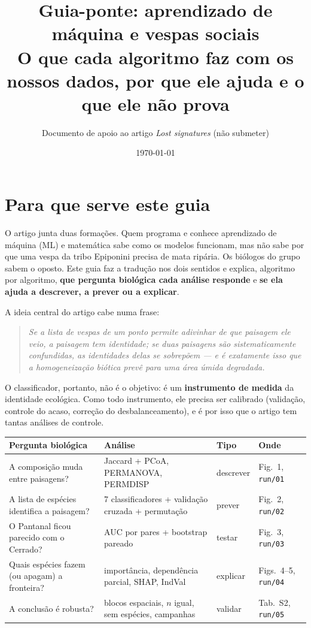 \documentclass[11pt,a4paper]{article}
\title{Guia-ponte: aprendizado de máquina e vespas sociais\\[2pt]
\large O que cada algoritmo faz com os nossos dados, por que ele ajuda e o que ele não prova}
\author{Documento de apoio ao artigo \emph{Lost signatures} (não submeter)}
\date{\today}
\begin{document}
\maketitle
\tableofcontents

\section{Para que serve este guia}
O artigo junta duas formações. Quem programa e conhece aprendizado de máquina (ML) e
matemática sabe como os modelos funcionam, mas não sabe por que uma vespa da tribo Epiponini
precisa de mata ripária. Os biólogos do grupo sabem o oposto. Este guia faz a tradução nos dois
sentidos e explica, algoritmo por algoritmo, \textbf{que pergunta biológica cada análise responde}
e \textbf{se ela ajuda a descrever, a prever ou a explicar}.

A ideia central do artigo cabe numa frase:
\begin{quote}
\emph{Se a lista de vespas de um ponto permite adivinhar de que paisagem ele veio, a paisagem tem
identidade; se duas paisagens são sistematicamente confundidas, as identidades delas se
sobrepõem --- e é exatamente isso que a homogeneização biótica prevê para uma área úmida
degradada.}
\end{quote}
O classificador, portanto, não é o objetivo: é um \textbf{instrumento de medida} da identidade
ecológica. Como todo instrumento, ele precisa ser calibrado (validação, controle do acaso,
correção do desbalanceamento), e é por isso que o artigo tem tantas análises de controle.

\begin{table}[h]
\centering\small
\begin{tabularx}{\textwidth}{>{\raggedright}p{4.1cm}>{\raggedright}p{4.2cm}lX}
\toprule
Pergunta biológica & Análise & Tipo & Onde\\
\midrule
A composição muda entre paisagens? & Jaccard + PCoA, PERMANOVA, PERMDISP & descrever & Fig.~1, \texttt{run/01}\\
A lista de espécies identifica a paisagem? & 7 classificadores + validação cruzada + permutação & prever & Fig.~2, \texttt{run/02}\\
O Pantanal ficou parecido com o Cerrado? & AUC por pares + bootstrap pareado & testar & Fig.~3, \texttt{run/03}\\
Quais espécies fazem (ou apagam) a fronteira? & importância, dependência parcial, SHAP, IndVal & explicar & Figs.~4--5, \texttt{run/04}\\
A conclusão é robusta? & blocos espaciais, $n$ igual, sem espécies, campanhas & validar & Tab.~S2, \texttt{run/05}\\
\bottomrule
\end{tabularx}
\end{table}
\end{document}
